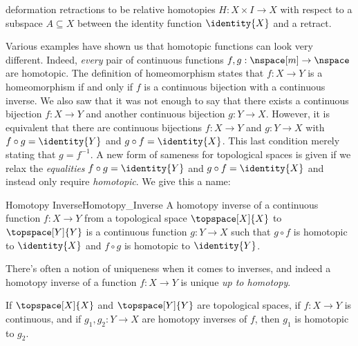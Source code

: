         deformation retractions to be relative homotopies
        $H:X\times{I}\rightarrow{X}$ with respect to a subspace
        $A\subseteq{X}$ between the identity function $\identity{X}$ and
        a retract.
        \par\hfill\par
        Various examples have shown us that homotopic functions can look
        very different. Indeed, \textit{every} pair of continuous
        functions $f,g:\nspace[m]\rightarrow\nspace$ are homotopic. The
        definition of homeomorphism states that $f:X\rightarrow{Y}$ is
        a homeomorphism if and only if $f$ is a continuous bijection
        with a continuous inverse. We also saw that it was not enough to
        say that there exists a continuous bijection $f:X\rightarrow{Y}$
        and another continuous bijection $g:Y\rightarrow{X}$. However,
        it is equivalent that there are continuous bijections
        $f:X\rightarrow{Y}$ and $g:Y\rightarrow{X}$ with
        $f\circ{g}=\identity{Y}$ and $g\circ{f}=\identity{X}$. This last
        condition merely stating that $g=f^{\minus{1}}$. A new form of
        sameness for topological spaces is given if we relax the
        \textit{equalities} $f\circ{g}=\identity{Y}$ and
        $g\circ{f}=\identity{X}$ and instead only require
        \textit{homotopic}. We give this a name:
        \begin{fdefinition}{Homotopy Inverse}{Homotopy_Inverse}
            A homotopy inverse of a continuous function
            $f:X\rightarrow{Y}$ from a topological space
            $\topspace[X]{X}$ to $\topspace[Y]{Y}$ is a continuous
            function $g:Y\rightarrow{X}$ such that $g\circ{f}$ is
            homotopic to $\identity{X}$ and $f\circ{g}$ is homotopic to
            $\identity{Y}$.
        \end{fdefinition}
        There's often a notion of uniqueness when it comes to inverses,
        and indeed a homotopy inverse of a function $f:X\rightarrow{Y}$
        is unique \textit{up to homotopy}.
        \begin{theorem}
            If $\topspace[X]{X}$ and $\topspace[Y]{Y}$ are topological
            spaces, if $f:X\rightarrow{Y}$ is continuous, and if
            $g_{1},g_{2}:Y\rightarrow{X}$ are homotopy inverses
            of $f$, then $g_{1}$ is homotopic to ${g}_{2}$.
        \end{theorem}
